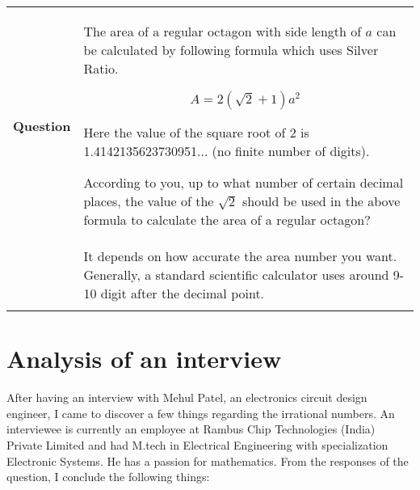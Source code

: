 \documentclass[12pt, letterpaper]{article}
\begin{document}
\begin{table}[H]
 			\centering
\begin{tabular}{p{0.69in}p{5.4in}}
\hline

\multicolumn{1}{|p{0.69in}}{\textbf{Question}} & 
\multicolumn{1}{|p{5.4in}|}{The area of a regular octagon with side length of $a$ can be calculated by following formula which uses Silver Ratio. \par 
\[ A = 2 (\sqrt{2} + 1) {a}^2 \]
 \par Here the value of the square root of 2 is 1.4142135623730951$ \ldots $  (no finite number of digits). \par According to you, up to what number of certain decimal places, the value of the \(\sqrt{2} \) should be used in the above formula to calculate the area of a regular octagon? \par } \\
\hhline{--}

\multicolumn{1}{|p{0.69in}}{\textbf{Response}} & 
\multicolumn{1}{|p{5.4in}|}{It depends on how accurate the area number you want. Generally, a standard scientific calculator uses around 9-10 digit after the decimal point.} \\
\hhline{--}

\end{tabular}
 \end{table}

\section{Analysis of an interview}
After having an interview with Mehul Patel, an electronics circuit design engineer, I came to discover a few things regarding the irrational numbers. An interviewee is currently an employee at Rambus Chip Technologies (India) Private Limited and had M.tech in Electrical Engineering with specialization Electronic Systems. He has a passion for mathematics. From the responses of the question, I conclude the following things:\par
\end{document}
